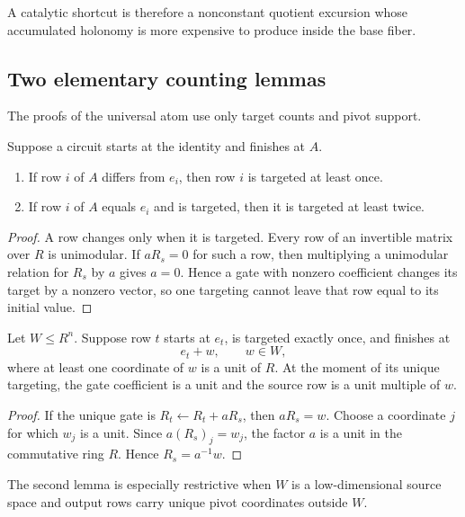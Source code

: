 A catalytic shortcut is therefore a nonconstant quotient excursion whose accumulated holonomy is more expensive to produce inside the base fiber.

\subsection{Two elementary counting lemmas}

The proofs of the universal atom use only target counts and pivot support.

\begin{lemma}\label{lem:target-count}
Suppose a circuit starts at the identity and finishes at $A$.
\begin{enumerate}[label=\textup{(\roman*)}]
\item If row $i$ of $A$ differs from $e_i$, then row $i$ is targeted at least once.
\item If row $i$ of $A$ equals $e_i$ and is targeted, then it is targeted at least twice.
\end{enumerate}
\end{lemma}

\begin{proof}
A row changes only when it is targeted.  Every row of an invertible matrix over $R$ is unimodular.  If $aR_s=0$ for such a row, then multiplying a unimodular relation for $R_s$ by $a$ gives $a=0$.  Hence a gate with nonzero coefficient changes its target by a nonzero vector, so one targeting cannot leave that row equal to its initial value.
\end{proof}

\begin{lemma}\label{lem:one-target-source}
Let $W\le R^n$.  Suppose row $t$ starts at $e_t$, is targeted exactly once, and finishes at
\[
e_t+w,
\qquad w\in W,
\]
where at least one coordinate of $w$ is a unit of $R$.  At the moment of its unique targeting, the gate coefficient is a unit and the source row is a unit multiple of $w$.
\end{lemma}

\begin{proof}
If the unique gate is $R_t\leftarrow R_t+aR_s$, then $aR_s=w$.  Choose a coordinate $j$ for which $w_j$ is a unit.  Since $a(R_s)_j=w_j$, the factor $a$ is a unit in the commutative ring $R$.  Hence $R_s=a^{-1}w$.
\end{proof}

The second lemma is especially restrictive when $W$ is a low-dimensional source space and output rows carry unique pivot coordinates outside $W$.


